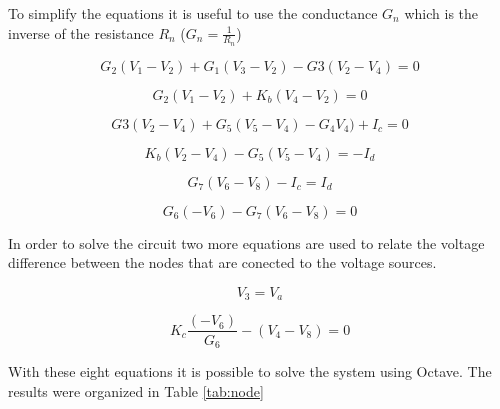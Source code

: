 To simplify the equations it is useful to use the conductance $G_n$ which is the inverse of the resistance $R_n$ 
($G_n=\frac{1}{R_n}$)

\begin{equation}
	G_2(V_1-V_2)+G_1(V_3-V_2) - G3(V_2-V_4) = 0
	\label{}
\end{equation}

\begin{equation}
	G_2(V_1-V_2)+K_b(V_4-V_2) = 0
	\label{}
\end{equation}

\begin{equation}
	G3(V_2-V_4)+G_5(V_5-V_4)-G_4V_4)+I_c = 0
	\label{}
\end{equation} 

\begin{equation}
	K_b(V_2-V_4)-G_5(V_5-V_4) = -I_d
	\label{}
\end{equation}

\begin{equation}
	G_7(V_6-V_8)-I_c = I_d
	\label{}
\end{equation}

\begin{equation}
	G_6(-V_6)-G_7(V_6-V_8) = 0
	\label{}
\end{equation}

In order to solve the circuit two more equations are used to relate the voltage difference between
the nodes that are conected to the voltage sources.

\begin{equation}
	V_3 = V_a
	\label{}
\end{equation}

\begin{equation}
	K_c\frac{(-V_6)}{G_6}-(V_4-V_8) = 0
	\label{}
\end{equation}


With these eight equations it is possible to solve the system using Octave.
The results were organized in Table \ref{tab:node}


